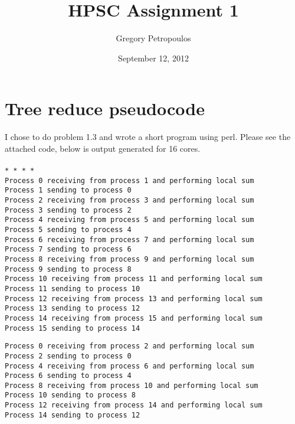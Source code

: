 \documentclass[11pt,a4paper,oneside]{report}
\begin{document}
\title{HPSC Assignment 1}
\author{Gregory Petropoulos}
\date{September 12, 2012}
\maketitle

\section{Tree reduce pseudocode}

I chose to do problem 1.3 and wrote a short program using perl.  Please see the attached code, below is output generated for 16 cores.
\\\\
\noindent\texttt{* * * *\\}
\noindent\texttt{Process 0 receiving from process 1 and performing local sum\\
Process 1 sending to process 0\\
Process 2 receiving from process 3 and performing local sum\\
Process 3 sending to process 2\\
Process 4 receiving from process 5 and performing local sum\\
Process 5 sending to process 4\\
Process 6 receiving from process 7 and performing local sum\\
Process 7 sending to process 6\\
Process 8 receiving from process 9 and performing local sum\\
Process 9 sending to process 8\\
Process 10 receiving from process 11 and performing local sum\\
Process 11 sending to process 10\\
Process 12 receiving from process 13 and performing local sum\\
Process 13 sending to process 12\\
Process 14 receiving from process 15 and performing local sum\\
Process 15 sending to process 14\\}

\noindent\texttt{Process 0 receiving from process 2 and performing local sum\\
Process 2 sending to process 0\\
Process 4 receiving from process 6 and performing local sum\\
Process 6 sending to process 4\\
Process 8 receiving from process 10 and performing local sum\\
Process 10 sending to process 8\\
Process 12 receiving from process 14 and performing local sum\\
Process 14 sending to process 12\\}
\end{document}
